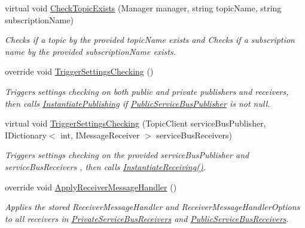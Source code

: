 \begin{DoxyCompactItemize}
virtual void \hyperlink{classCqrs_1_1Azure_1_1ServiceBus_1_1AzureServiceBus_ab7f636dd2b5009f1a58a530c47f2536a_ab7f636dd2b5009f1a58a530c47f2536a}{Check\+Topic\+Exists} (Manager manager, string topic\+Name, string subscription\+Name)
\begin{DoxyCompactList}\small\item\em Checks if a topic by the provided {\itshape topic\+Name}  exists and Checks if a subscription name by the provided {\itshape subscription\+Name}  exists. \end{DoxyCompactList}\item 
override void \hyperlink{classCqrs_1_1Azure_1_1ServiceBus_1_1AzureServiceBus_ae4b736019e332a81eb08d3696f8b6e7e_ae4b736019e332a81eb08d3696f8b6e7e}{Trigger\+Settings\+Checking} ()
\begin{DoxyCompactList}\small\item\em Triggers settings checking on both public and private publishers and receivers, then calls \hyperlink{classCqrs_1_1Azure_1_1ServiceBus_1_1AzureServiceBus_a5c286d29b0bbfe3770f3407efda57036_a5c286d29b0bbfe3770f3407efda57036}{Instantiate\+Publishing} if \hyperlink{classCqrs_1_1Azure_1_1ServiceBus_1_1AzureServiceBus_a17195f3c8e05ec37dfac37a8e9e1b089_a17195f3c8e05ec37dfac37a8e9e1b089}{Public\+Service\+Bus\+Publisher} is not null. \end{DoxyCompactList}\item 
virtual void \hyperlink{classCqrs_1_1Azure_1_1ServiceBus_1_1AzureServiceBus_a26e66a663cabca99160b7f7c650bbfaa_a26e66a663cabca99160b7f7c650bbfaa}{Trigger\+Settings\+Checking} (Topic\+Client service\+Bus\+Publisher, I\+Dictionary$<$ int, I\+Message\+Receiver $>$ service\+Bus\+Receivers)
\begin{DoxyCompactList}\small\item\em Triggers settings checking on the provided {\itshape service\+Bus\+Publisher}  and {\itshape service\+Bus\+Receivers} , then calls \hyperlink{classCqrs_1_1Azure_1_1ServiceBus_1_1AzureServiceBus_ad49a2d063279ec98443e7f1d69178cfa_ad49a2d063279ec98443e7f1d69178cfa}{Instantiate\+Receiving()}. \end{DoxyCompactList}\item 
override void \hyperlink{classCqrs_1_1Azure_1_1ServiceBus_1_1AzureServiceBus_a6ea94560e02fce0d920c467062f5fc98_a6ea94560e02fce0d920c467062f5fc98}{Apply\+Receiver\+Message\+Handler} ()
\begin{DoxyCompactList}\small\item\em Applies the stored Receiver\+Message\+Handler and Receiver\+Message\+Handler\+Options to all receivers in \hyperlink{classCqrs_1_1Azure_1_1ServiceBus_1_1AzureServiceBus_aabe85675218dd5d535459850fff1b322_aabe85675218dd5d535459850fff1b322}{Private\+Service\+Bus\+Receivers} and \hyperlink{classCqrs_1_1Azure_1_1ServiceBus_1_1AzureServiceBus_a6498253027d0f613f76e0b8c8112da1e_a6498253027d0f613f76e0b8c8112da1e}{Public\+Service\+Bus\+Receivers}. \end{DoxyCompactList}\item 

\end{DoxyCompactItemize}
